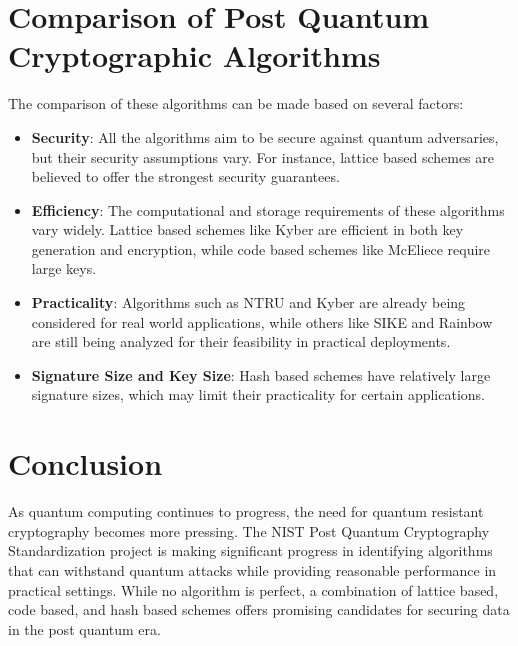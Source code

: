 \documentclass[a4paper,12pt]{article}
\begin{document}
\section[Comparison of Post Quantum Cryptographic Algorithms]{Comparison of Post Quantum \\Cryptographic Algorithms}
The comparison of these algorithms can be made based on several factors:
\begin{itemize}
    \item \textbf{Security}: All the algorithms aim to be secure against quantum adversaries, but their security assumptions vary. For instance, lattice based schemes are believed to offer the strongest security guarantees.
    \item \textbf{Efficiency}: The computational and storage requirements of these algorithms vary widely. Lattice based schemes like Kyber are efficient in both key generation and encryption, while code based schemes like McEliece require large keys.
    \item \textbf{Practicality}: Algorithms such as NTRU and Kyber are already being considered for real world applications, while others like SIKE and Rainbow are still being analyzed for their feasibility in practical deployments.
    \item \textbf{Signature Size and Key Size}: Hash based schemes have relatively large signature sizes, which may limit their practicality for certain applications.
\end{itemize}

\section{Conclusion}
As quantum computing continues to progress, the need for quantum resistant cryptography becomes more pressing. The NIST Post Quantum Cryptography Standardization project is making significant progress in identifying algorithms that can withstand quantum attacks while providing reasonable performance in practical settings. While no algorithm is perfect, a combination of lattice based, code based, and hash based schemes offers promising candidates for securing data in the post quantum era.
\end{document}
